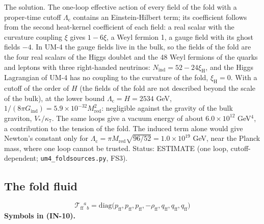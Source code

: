\documentclass[
  10pt,
]{article}
\begin{document}
The solution. The one-loop effective action of every field of the fold
with a proper-time cutoff \(\Lambda_{\mathrm{c}}\) contains an
Einstein-Hilbert term; its coefficient follows from the second
heat-kernel coefficient of each field: a real scalar with the curvature
coupling \(\xi\) gives \(1 - 6\xi\), a Weyl fermion 1, a gauge field
with its ghost fields \(-4\). In UM-4 the gauge fields live in the bulk,
so the fields of the fold are the four real scalars of the Higgs doublet
and the 48 Weyl fermions of the quarks and leptons with three
right-handed neutrinos: \(N_{\mathrm{ind}} = 52 - 24\xi_{\mathrm{H}}\),
and the Higgs Lagrangian of UM-4 has no coupling to the curvature of the
fold, \(\xi_{\mathrm{H}} = 0\). With a cutoff of the order of \(H\) (the
fields of the fold are not described beyond the scale of the bulk), at
the lower bound \(\Lambda_{\mathrm{c}} = H = 2534\) GeV,
\(1/(8\pi G_{\mathrm{ind}}) = 5.9\times10^{-32}M_{\mathrm{red}}^2\):
negligible against the gravity of the bulk graviton, \(V_*/\kappa_7\).
The same loops give a vacuum energy of about \(6.0\times10^{12}\)
GeV\(^4\), a contribution to the tension of the fold. The induced term
alone would give Newton's constant only for
\(\Lambda_{\mathrm{c}} = \pi M_{\mathrm{red}}\sqrt{96/52} = 1.0\times10^{19}\)
GeV, near the Planck mass, where one loop cannot be trusted. Status:
ESTIMATE (one loop, cutoff-dependent; \texttt{um4\_foldsources.py},
FS3).

\hypertarget{the-fold-fluid}{%
\subsection{The fold fluid}\label{the-fold-fluid}}

\[
\mathcal{T}_{\mathrm{ff}}{}^a{}_b = \mathrm{diag}\big(p_{\mathrm{ff}}, p_{\mathrm{ff}}, p_{\mathrm{ff}}, -\rho_{\mathrm{ff}},
 q_{\mathrm{ff}}, q_{\mathrm{ff}}, q_{\mathrm{ff}}\big) \tag{IN-10}
\] \textbf{Symbols in (IN-10).}
\end{document}
